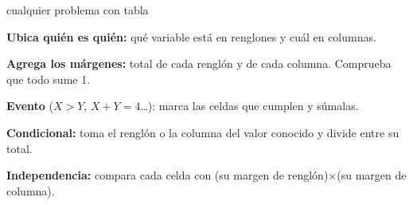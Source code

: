 \begin{receta}{cualquier problema con tabla}
\begin{pasosreceta}
\item \textbf{Ubica qui\'en es qui\'en:} qu\'e variable est\'a en renglones y cu\'al en columnas.
\item \textbf{Agrega los m\'argenes:} total de cada rengl\'on y de cada columna. Comprueba que todo sume 1.
\item \textbf{Evento} ($X>Y$, $X+Y=4$\ldots): marca las celdas que cumplen y s\'umalas.
\item \textbf{Condicional:} toma el rengl\'on o la columna del valor conocido y divide entre su total.
\item \textbf{Independencia:} compara cada celda con (su margen de rengl\'on)$\times$(su margen de columna).
\end{pasosreceta}
\end{receta}

